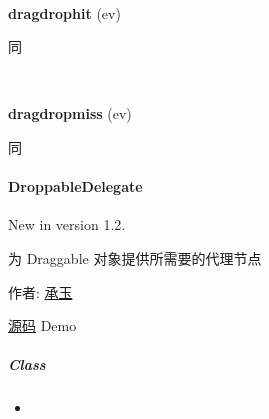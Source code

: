 \documentclass[letterpaper,10pt,english]{sphinxmanual}
\begin{document}

\begin{fulllineitems}
\label{api/component/dd/draggable-delegate:DraggableDelegate.dragdrophit}~
\begin{DUlineblock}{0em}
\item[] \textbf{dragdrophit} (ev)
\item[] 同 {\hyperref[api/component/dd/draggable:Draggable.dragdrophit]{}}
\end{DUlineblock}

\end{fulllineitems}



\begin{fulllineitems}
\label{api/component/dd/draggable-delegate:DraggableDelegate.dragdropmiss}~
\begin{DUlineblock}{0em}
\item[] \textbf{dragdropmiss} (ev)
\item[] 同 {\hyperref[api/component/dd/draggable:Draggable.dragdropmiss]{}}
\end{DUlineblock}

\end{fulllineitems}

\label{api/component/dd/droppable-delegate:module-DroppableDelegate}

\paragraph{DroppableDelegate}
\label{api/component/dd/droppable-delegate::doc}\label{api/component/dd/droppable-delegate:droppabledelegate}New in version 1.2.
\begin{DUlineblock}{0em}
\item[] 为 Draggable 对象提供所需要的代理节点
\item[] 作者: \href{mailto:chengyu@taobao.com}{承玉}
\item[] \href{https://github.com/kissyteam/kissy/tree/master/src/dd/droppable-delegate.js}{源码}  \textbar{} Demo
\end{DUlineblock}


\subparagraph{Class}
\label{api/component/dd/droppable-delegate:class}\begin{itemize}
\item {}
{\hyperref[api/component/dd/droppable-delegate:DroppableDelegate.DroppableDelegate]{}}

\end{itemize}
\end{document}
